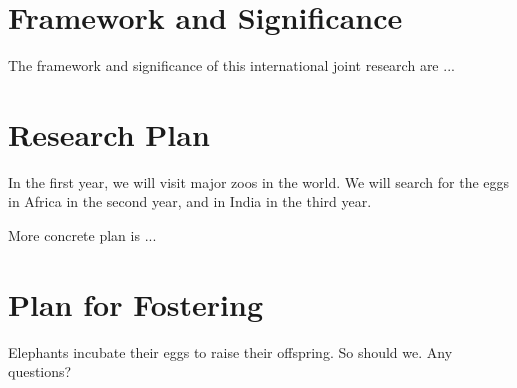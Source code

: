 \documentclass[11pt,a4paper,dvipdfmx]{article} 		%
\newcommand{\研究課題名}{象の卵}
\newcommand{\研究機関名}{逢坂大学}
\newcommand{\研究代表者氏名}{湯川秀樹}
\begin{document}

\section{Framework and Significance}

\JSPSInstructions		%
	The framework and significance of this international joint research
	are ...



\section{Research Plan}


	In the first year, we will visit major zoos in the world.
	We will search for the eggs in Africa in the second year, 
	and in India in the third year.

	More concrete plan is ...




\section{Plan for Fostering}


	Elephants incubate their eggs to raise their offspring.
	So should we.
	Any questions?
	
	



\end{document}
